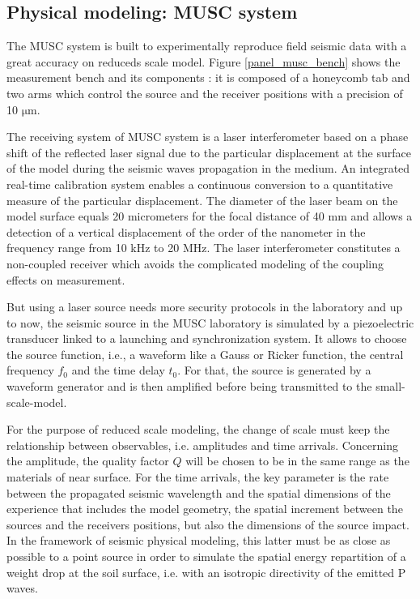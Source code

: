 \documentclass[manuscript,revised]{geophysics}
\begin{document}
\subsection{Physical modeling: MUSC system}

\noindent The MUSC system \citep{Bretaudeau_SSA_2008b,Bretaudeau_SSM_2011,Bretaudeau_FWI_2013} is built to experimentally reproduce field seismic data with a great accuracy on reduceds scale model. Figure \ref{panel_musc_bench} shows the measurement bench and its components : it is composed of a honeycomb tab and two arms which control the source and the receiver positions with a precision of 10 $\mathrm{\mu m}$.

\noindent The receiving system of MUSC system is a laser interferometer based on a phase shift of the reflected laser signal due to the particular displacement at the surface of the model during the seismic waves propagation in the medium. An integrated real-time calibration system enables a continuous conversion to a quantitative measure of the particular displacement. The diameter of the laser beam on the model surface equals 20 micrometers for the focal distance of 40 mm and allows a detection of a vertical displacement of the order of the nanometer in the frequency range from 10 kHz to 20 MHz. The laser interferometer constitutes a non-coupled receiver which avoids the complicated modeling of the coupling effects on measurement.

\noindent But using a laser source needs more security protocols in the laboratory and up to now, the seismic source in the MUSC laboratory is simulated by a piezoelectric transducer linked to a launching and synchronization system. It allows to choose the source function, i.e., a waveform like a Gauss or Ricker function, the central frequency $f_{0}$ and the time delay $t_{0}$. For that, the source is generated by a waveform generator and is then amplified before being transmitted to the small-scale-model.

\noindent For the purpose of reduced scale modeling, the change of scale must keep the relationship between observables, i.e. amplitudes and time arrivals. Concerning the amplitude, the quality factor $Q$ will be chosen to be in the same range as the materials of near surface. For the time arrivals, the key parameter is the rate between the propagated seismic wavelength and the spatial dimensions of the experience that includes the model geometry, the spatial increment between the sources and the receivers positions, but also the dimensions of the source impact. In the framework of seismic physical modeling, this latter must be as close as possible to a point source in order to simulate the spatial energy repartition of a weight drop at the soil surface, i.e. with an isotropic directivity of the emitted P waves.
\end{document}
